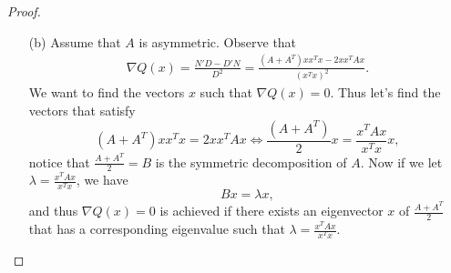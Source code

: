\documentclass[12pt]{report}
\begin{document}
\begin{problem}
\begin{proof}
\begin{enumerate}
    
    \item [(b)]
    Assume that $A$ is asymmetric. Observe that 
    \begin{align*}
        \nabla Q(x) = \frac{N'D - D'N}{D^2} = \frac{(A + A^T)x x^Tx - 2x x^TAx}{(x^Tx)^2}.
    \end{align*}    
    We want to find the vectors $x$ such that $\nabla Q(x) =0$. Thus let's find the vectors that satisfy
    \[
        (A + A^T)x x^Tx = 2x x^TAx \iff \frac{(A + A^T)}{2} x = \frac{x^T A x}{x^T x} x,
    \]
    notice that $\frac{A + A^T}{2} = B$ is the symmetric decomposition of $A$. Now if we let $\lambda = \frac{x^T A x}{x^T x}$, we have
    \[
         Bx = \lambda x,
    \]
    and thus $\nabla Q(x) = 0$ is achieved if there exists an eigenvector $x$ of $\frac{A +A^T}{2}$ that has a corresponding eigenvalue such that $\lambda = \frac{x^T A x}{x^T x}$. 
    

\end{enumerate}


\end{proof}
\end{problem}




\end{document}
